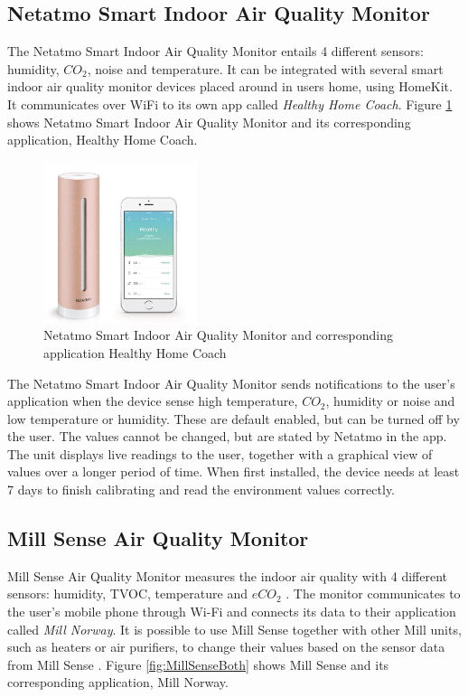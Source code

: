 \subsection{Netatmo Smart Indoor Air Quality Monitor}
The Netatmo Smart Indoor Air Quality Monitor entails 4 different sensors: humidity, \(CO_2\), noise and temperature. It can be integrated with several smart indoor air quality monitor devices placed around in users home, using HomeKit. It communicates over WiFi to its own app called \textit{Healthy Home Coach}. Figure \ref{fig:Netatmo} shows Netatmo Smart Indoor Air Quality Monitor and its corresponding application, Healthy Home Coach. 
\begin{figure} [H]
    \centering
    \includegraphics[width=0.4\textwidth]{figures/Netatmo.png}
    \caption{Netatmo Smart Indoor Air Quality Monitor and corresponding application Healthy Home Coach \cite{NetatmoDevice}}
    \label{fig:Netatmo}
\end{figure}

The Netatmo Smart Indoor Air Quality Monitor sends notifications to the user's application when the device sense high temperature, \(CO_2\), humidity or noise and low temperature or humidity. These are default enabled, but can be turned off by the user. The values cannot be changed, but are stated by Netatmo in the app. The unit displays live readings to the user, together with a graphical view of values over a longer period of time. When first installed, the device needs at least 7 days to finish calibrating and read the environment values correctly. 

\subsection{Mill Sense Air Quality Monitor}
Mill Sense Air Quality Monitor measures the indoor air quality with 4 different sensors: humidity, \gls{TVOC}, temperature and \(eCO_2\) \cite{Mill}. The monitor communicates to the user's mobile phone through Wi-Fi and connects its data to their application called \textit{Mill Norway}. It is possible to use Mill Sense together with other Mill units, such as heaters or air purifiers,  to change their values based on the sensor data from Mill Sense \cite{Mill}. Figure \ref{fig:MillSenseBoth} shows Mill Sense and its corresponding application, Mill Norway. 

